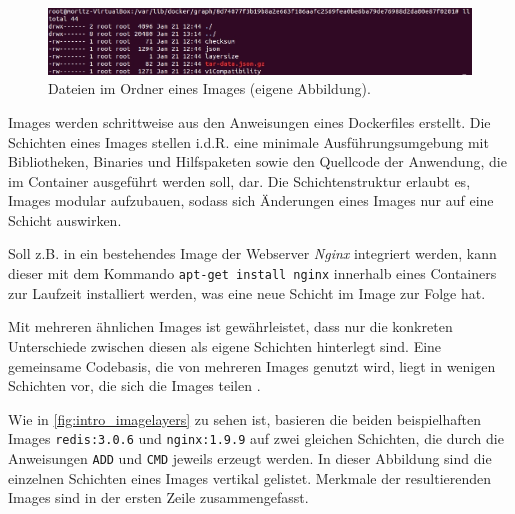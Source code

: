 \documentclass[../main.tex]{subfiles}
\begin{document}
			\begin{figure}[!htbp]
          \centering
          \includegraphics[width=1.0\textwidth]{./images/intro_dockerImageVZ.jpg}
          \caption{Dateien im Ordner eines Images (eigene Abbildung).}
          \label{fig:intro_dockerImageVZ}
      \end{figure}

			Images werden schrittweise aus den Anweisungen eines Dockerfiles erstellt. Die Schichten eines Images stellen i.d.R. eine minimale Ausführungsumgebung mit Bibliotheken, Binaries und Hilfspaketen sowie den Quellcode der Anwendung, die im Container ausgeführt werden soll, dar. Die Schichtenstruktur erlaubt es, Images modular aufzubauen, sodass sich Änderungen eines Images nur auf eine Schicht auswirken.

			Soll z.B. in ein bestehendes Image der Webserver \emph{Nginx} integriert werden, kann dieser mit dem Kommando \texttt{apt-get install nginx} innerhalb eines Containers zur Laufzeit installiert werden, was eine neue Schicht im Image zur Folge hat.

			Mit mehreren ähnlichen Images ist gewährleistet, dass nur die konkreten Unterschiede zwischen diesen als eigene Schichten hinterlegt sind. Eine gemeinsame Codebasis, die von mehreren Images genutzt wird, liegt in wenigen Schichten vor, die sich die Images teilen \cite[S.3]{dockerIntroIEEE}.

			Wie in \fig \ref{fig:intro_imagelayers} zu sehen ist, basieren die beiden beispielhaften Images \texttt{redis:3.0.6} und \texttt{nginx:1.9.9} auf zwei gleichen Schichten, die durch die Anweisungen \texttt{ADD} und \texttt{CMD} jeweils erzeugt werden. In dieser Abbildung sind die einzelnen Schichten eines Images vertikal gelistet. Merkmale der resultierenden Images sind in der ersten Zeile zusammengefasst.
\end{document}
